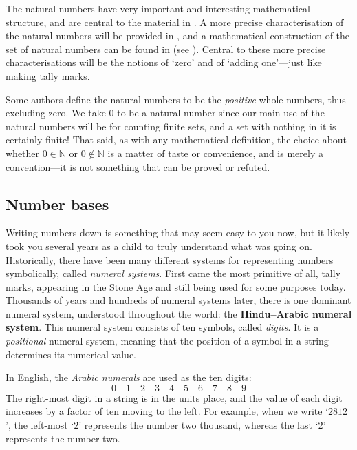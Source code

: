 The natural numbers have very important and interesting mathematical structure, and are central to the material in . A more precise characterisation of the natural numbers will be provided in , and a mathematical construction of the set of natural numbers can be found in  (see ). Central to these more precise characterisations will be the notions of `zero' and of `adding one'---just like making tally marks.

\begin{aside}
Some authors define the natural numbers to be the \textit{positive} whole numbers, thus excluding zero. We take $0$ to be a natural number since our main use of the natural numbers will be for counting finite sets, and a set with nothing in it is certainly finite! That said, as with any mathematical definition, the choice about whether $0 \in \mathbb{N}$ or $0 \not \in \mathbb{N}$ is a matter of taste or convenience, and is merely a convention---it is not something that can be proved or refuted.
\end{aside}

\subsection*{Number bases}

Writing numbers down is something that may seem easy to you now, but it likely took you several years as a child to truly understand what was going on. Historically, there have been many different systems for representing numbers symbolically, called \textit{numeral systems}. First came the most primitive of all, tally marks, appearing in the Stone Age and still being used for some purposes today. Thousands of years and hundreds of numeral systems later, there is one dominant numeral system, understood throughout the world: the \textbf{Hindu--Arabic numeral system}. This numeral system consists of ten symbols, called \textit{digits}. It is a \textit{positional} numeral system, meaning that the position of a symbol in a string determines its numerical value.

In English, the \textit{Arabic numerals} are used as the ten digits:
\[ 0 \quad 1 \quad 2 \quad 3 \quad 4 \quad 5 \quad 6 \quad 7 \quad 8 \quad 9 \]
The right-most digit in a string is in the units place, and the value of each digit increases by a factor of ten moving to the left. For example, when we write `$2812$', the left-most `$2$' represents the number two thousand, whereas the last `$2$' represents the number two.

